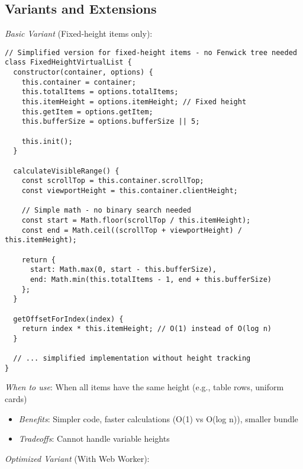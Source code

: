 \documentclass[11pt]{article}
\begin{document}
\subsection{Variants and Extensions}
\label{sec:org98b2a89}

\emph{Basic Variant} (Fixed-height items only):

\begin{verbatim}
// Simplified version for fixed-height items - no Fenwick tree needed
class FixedHeightVirtualList {
  constructor(container, options) {
    this.container = container;
    this.totalItems = options.totalItems;
    this.itemHeight = options.itemHeight; // Fixed height
    this.getItem = options.getItem;
    this.bufferSize = options.bufferSize || 5;
    
    this.init();
  }
  
  calculateVisibleRange() {
    const scrollTop = this.container.scrollTop;
    const viewportHeight = this.container.clientHeight;
    
    // Simple math - no binary search needed
    const start = Math.floor(scrollTop / this.itemHeight);
    const end = Math.ceil((scrollTop + viewportHeight) / this.itemHeight);
    
    return {
      start: Math.max(0, start - this.bufferSize),
      end: Math.min(this.totalItems - 1, end + this.bufferSize)
    };
  }
  
  getOffsetForIndex(index) {
    return index * this.itemHeight; // O(1) instead of O(log n)
  }
  
  // ... simplified implementation without height tracking
}
\end{verbatim}

\emph{When to use}: When all items have the same height (e.g., table rows, uniform cards)
\begin{itemize}
\item \emph{Benefits}: Simpler code, faster calculations (O(1) vs O(log n)), smaller bundle
\item \emph{Tradeoffs}: Cannot handle variable heights
\end{itemize}

\emph{Optimized Variant} (With Web Worker):
\end{document}
